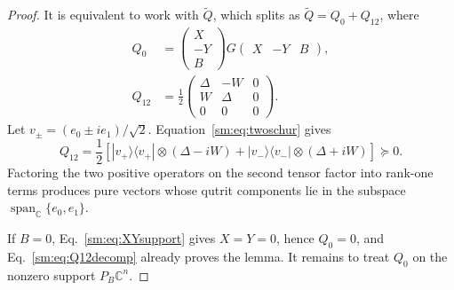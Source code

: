 \documentclass[aps,prl,reprint,superscriptaddress,nofootinbib]{revtex4-2}
\newcommand{\C}{\mathbb C}
\begin{document}
\begin{proof}
It is equivalent to work with \(\widetilde Q\), which splits as
\(\widetilde Q=Q_0+Q_{12}\), where
\begin{align}
 Q_0&=\begin{pmatrix}X\\-Y\\B\end{pmatrix}
 G\begin{pmatrix}X&-Y&B\end{pmatrix},
\label{sm:eq:Q0}\\
 Q_{12}&=\frac12\begin{pmatrix}
 \Delta&-W&0\\W&\Delta&0\\0&0&0
 \end{pmatrix}.
\label{sm:eq:Q12}
\end{align}
Let \(v_\pm=(e_0\pm i e_1)/\sqrt2\).  Equation~\eqref{sm:eq:twoschur}
gives
\begin{equation}
 Q_{12}=\frac12\left[
 |v_+\rangle\langle v_+|\otimes(\Delta-iW)
 +|v_-\rangle\langle v_-|\otimes(\Delta+iW)\right]\succeq0.
\label{sm:eq:Q12decomp}
\end{equation}
Factoring the two positive operators on the second tensor factor into
rank-one terms
produces pure vectors whose qutrit components lie in the subspace
\(\operatorname{span}_{\C}\{e_0,e_1\}\).

If \(B=0\), Eq.~\eqref{sm:eq:XYsupport} gives \(X=Y=0\), hence
\(Q_0=0\), and Eq.~\eqref{sm:eq:Q12decomp} already proves the lemma.
It remains to treat \(Q_0\) on the nonzero support \(P_B\C^n\).


\end{proof}
\end{document}
